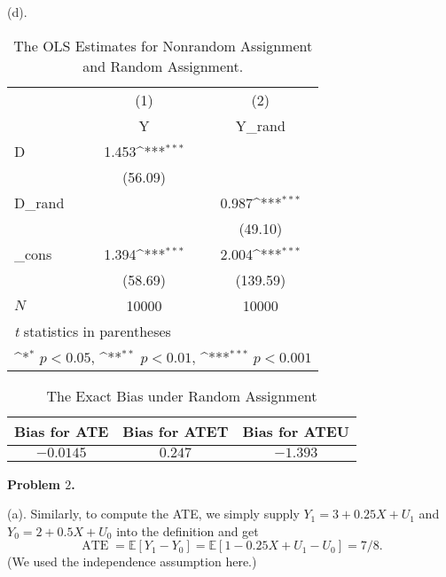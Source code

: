 \documentclass[11pt,a4paper]{amsart}
\theoremstyle{plain}
\theoremstyle{definition}
\begin{document}
(d).
\begin{table}[hb]
	\caption{\label{tb: nonran_and_rad}The OLS Estimates for Nonrandom Assignment and Random Assignment.}
	{
	\def\sym#1{\ifmmode^{#1}\else\(^{#1}\)\fi}
	\begin{tabular}{l*{2}{c}}
		\hline\hline
		&\multicolumn{1}{c}{(1)}&\multicolumn{1}{c}{(2)}\\
		&\multicolumn{1}{c}{Y}&\multicolumn{1}{c}{Y\_rand}\\
		\hline
		D           &       1.453\sym{***}&                     \\
		&     (56.09)         &                     \\
		[1em]
		D\_rand      &                     &       0.987\sym{***}\\
		&                     &     (49.10)         \\
		[1em]
		\_cons      &       1.394\sym{***}&       2.004\sym{***}\\
		&     (58.69)         &    (139.59)         \\
		\hline
		\(N\)       &       10000         &       10000         \\
		\hline\hline
		\multicolumn{3}{l}{\footnotesize \textit{t} statistics in parentheses}\\
		\multicolumn{3}{l}{\footnotesize \sym{*} \(p<0.05\), \sym{**} \(p<0.01\), \sym{***} \(p<0.001\)}\\
	\end{tabular}
}
\end{table}


\begin{table}[hbt]
	\caption{\label{tb:exact_bias_random} The Exact Bias under Random Assignment}
	{
		\def\sym#1{\ifmmode^{#1}\else\(^{#1}\)\fi}
		\begin{tabular}{||c|c|c||}
			\hline
			Bias for ATE & Bias for ATET & Bias for  ATEU \\
			\hline
			$-0.0145$ & $0.247$ & $-1.393$ \\
			\hline
	\end{tabular} }
\end{table}
\newpage
\textbf{Problem $2$.}\hfill\par 

\vspace{5pt}

(a). Similarly, to compute the ATE, we simply supply $Y_{1} = 3 + 0.25 X + U_{1}$ and $Y_{0} = 2 + 0.5X + U_{0}$ into the definition and get
\[	\operatorname{ATE} = \mathbb{E}[Y_{1} - Y_{0}] = \mathbb{E}[1 - 0.25X + U_{1} - U_{0}] = 7/8.	\]
(We used the independence assumption here.)
\vspace{5pt}
\end{document}
